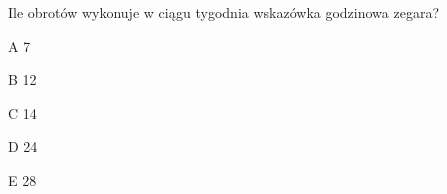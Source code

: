 \begin{tresc}
Ile obrotów wykonuje w ciągu tygodnia wskazówka godzinowa zegara?
\end{tresc}
\begin{wariant}{A} 7 \end{wariant}
\begin{wariant}{B} 12 \end{wariant}
\begin{wariant}{C} 14 \end{wariant}
\begin{wariant}{D} 24 \end{wariant}
\begin{wariant}{E} 28 \end{wariant}
